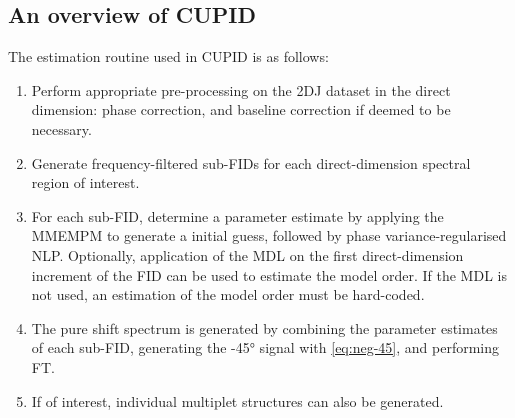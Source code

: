\subsection{An overview of \acs{CUPID}}
The estimation routine used in \ac{CUPID} is as follows:
\begin{enumerate}
    \item Perform appropriate pre-processing on the \ac{2DJ} dataset in the
        direct dimension: phase correction, and baseline correction if deemed
        to be necessary.
    \item Generate frequency-filtered sub-\acp{FID} for each direct-dimension
        spectral region of interest.
    \item For each sub-\ac{FID}, determine a parameter estimate by applying
        the \ac{MMEMPM} to generate a initial guess, followed by phase
        variance-regularised \ac{NLP}. Optionally, application of the \ac{MDL}
        on the first direct-dimension increment of the \ac{FID} can be used to
        estimate the model order. If the \ac{MDL} is not used, an estimation of
        the model order must be hard-coded.
    \item The pure shift spectrum is generated by combining the parameter
        estimates of each sub-\ac{FID}, generating the \ang{-45} signal with
        \eqref{eq:neg-45}, and performing \ac{FT}.
    \item If of interest, individual multiplet structures can also be generated.
\end{enumerate}
